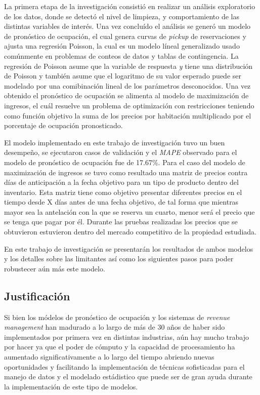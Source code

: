 La primera etapa de la investigación consistió en realizar un análisis exploratorio de los datos, donde se detectó el nivel de limpieza, y comportamiento de las distintas variables de interés. Una vez concluído el análisis se generó un modelo de pronóstico de ocupación, el cual genera curvas de \emph{pickup} de reservaciones y ajusta una regresión Poisson, la cual es un modelo líneal generalizado usado comúnmente en problemas de conteos de datos y tablas de contingencia. La regresión de Poisson asume que la variable de respuesta \emph{y} tiene una distribución de Poisson y también asume que el logaritmo de su valor esperado puede ser modelado por una comibinación lineal de los parámetros desconocidos. Una vez obtenido el pronóstico de ocupación se alimenta al modelo de maximización de ingresos, el cuál resuelve un problema de optimización con restricciones teniendo como función objetivo la suma de los precios por habitación multiplicado por el porcentaje de ocupación pronosticado.

El modelo implementado en este trabajo de investigación tuvo un buen desempeño, se ejecutaron casos de validación y el \emph{MAPE} observado para el modelo de pronóstico de ocupación fue de 17.67\%. Para el caso del modelo de maximización de ingresos se tuvo como resultado una matriz de precios contra días de anticipación a la fecha objetivo para un tipo de producto dentro del inventario. Esta matriz tiene como objetivo presentar diferentes precios en el tiempo desde X días antes de una fecha objetivo, de tal forma que mientras mayor sea la antelación con la que se reserva un cuarto, menor será el precio que se tenga que pagar por él. Durante las pruebas realizadas los precios que se obtuvieron estuvieron dentro del mercado competitivo de la propiedad estudiada.

En este trabajo de investigación se presentarán los resultados de ambos modelos y los detalles sobre las limitantes así como los siguientes pasos para poder robustecer aún más este modelo.

\subsection*{Justificación}

Si bien los módelos de pronóstico de ocupación y los sistemas de \emph{revenue management} han madurado a lo largo de más de 30 años de haber sido implementados por primera vez en distintas industrias, aún hay mucho trabajo por hacer ya que el poder de cómputo y la capacidad de procesamiento ha aumentado significativamente a lo largo del tiempo abriendo nuevas oportunidades y facilitando la implementación de técnicas sofisticadas para el manejo de datos y el modelado estádistico que puede ser de gran ayuda durante la implementación de este tipo de modelos.

